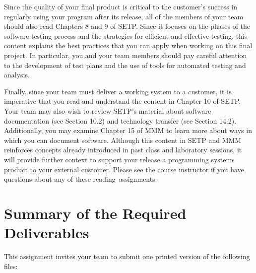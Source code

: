 Since the quality of your final product is critical to the customer's success in regularly using your program after its
release, all of the members of your team should also read Chapters 8 and 9 of SETP. Since it focuses on the phases of
the software testing process and the strategies for efficient and effective testing, this content explains the best
practices that you can apply when working on this final project. In particular, you and your team members should pay
careful attention to the development of test plans and the use of tools for automated testing and analysis.

 Finally, since your team must deliver a working system to a customer, it is imperative that you read and understand the
 content in Chapter 10 of SETP. Your team may also wish to review SETP's material about software documentation (see
 Section 10.2) and technology transfer (see Section 14.2).  Additionally, you may examine Chapter 15 of MMM to learn
 more about ways in which you can document software. Although this content in SETP and MMM reinforces concepts already
 introduced in past class and laboratory sessions, it will provide further context to support your release a programming
 systems product to your external customer.  Please see the course instructor if you have questions about any of these
 \mbox{reading assignments}.

\section*{Summary of the Required Deliverables}

This assignment invites your team to submit one printed version of the following files:

